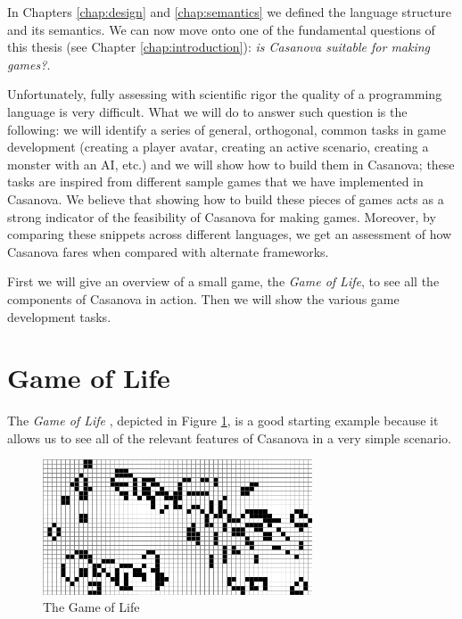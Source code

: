 In Chapters \ref{chap:design} and \ref{chap:semantics} we defined the language structure and its semantics. We can now move onto one of the fundamental questions of this thesis (see Chapter \ref{chap:introduction}): \textit{is Casanova suitable for making games?}.

Unfortunately, fully assessing with scientific rigor the quality of a programming language is very difficult. What we will do to answer such question is the following: we will identify a series of general, orthogonal, common tasks in game development (creating a player avatar, creating an active scenario, creating a monster with an AI, etc.) and we will show how to build them in Casanova; these tasks are inspired from different sample games that we have implemented in Casanova. We believe that showing how to build these pieces of games acts as a strong indicator of the feasibility of Casanova for making games. Moreover, by comparing these snippets across different languages, we get an assessment of how Casanova fares when compared with alternate frameworks.

First we will give an overview of a small game, the \textit{Game of Life}, to see all the components of Casanova in action. Then we will show the various game development tasks.

\section{Game of Life}
The \textit{Game of Life} \cite{GAME_OF_LIFE}, depicted in Figure \ref{fig:game_of_life}, is a good starting example because it allows us to see all of the relevant features of Casanova in a very simple scenario.

\begin{figure}
\begin{center}
\includegraphics[width=8cm]{Pics/game_of_life.png}
\end{center}
\caption{The Game of Life}
\label{fig:game_of_life}
\end{figure}

